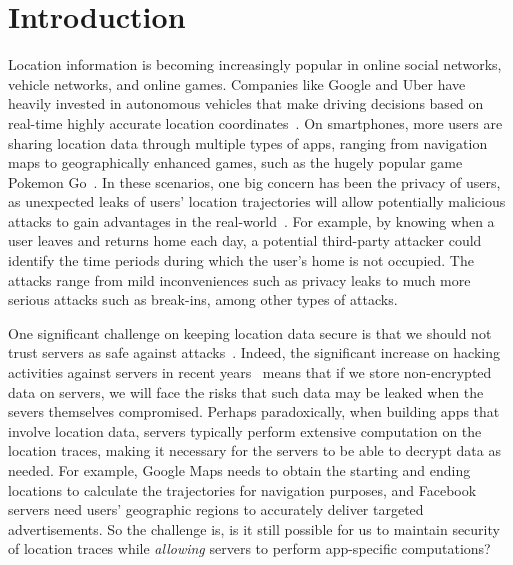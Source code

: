 \section{Introduction}
\label{sec:introduction}

Location information is becoming increasingly popular in online social networks, vehicle networks, and online games. Companies like Google and Uber have heavily invested in autonomous vehicles that make driving decisions based on real-time highly accurate location coordinates~\cite{markoff2010google}. On smartphones, more users are sharing location data through multiple types of apps, ranging from navigation maps to geographically enhanced games, such as the hugely popular game Pokemon Go~\cite{pokeman}. In these scenarios, one big concern has been the privacy of users, as unexpected leaks of users' location trajectories will allow potentially malicious attacks to gain advantages in the real-world~\cite{locationprivacy}. For example, by knowing when a user leaves and returns home each day, a potential third-party attacker could identify the time periods during which the user’s home is not occupied.  The attacks range from mild inconveniences such as privacy leaks to much more serious attacks such as break-ins, among other types of attacks.

One significant challenge on keeping location data secure is that we should not trust servers as safe against attacks~\cite{krutz2010cloud}. Indeed, the significant increase on hacking activities against servers in recent years~\cite{liao2013intrusion,grispos2013calm} means that if we store non-encrypted data on servers, we will face the risks that such data may be leaked when the severs themselves compromised. Perhaps paradoxically, when building apps that involve location data, servers typically perform extensive computation on the location traces, making it necessary for the servers to be able to decrypt data as needed. For example, Google Maps needs to obtain the starting and ending locations to calculate the trajectories for navigation purposes, and Facebook servers need users' geographic regions to accurately deliver targeted advertisements. So the challenge is, is it still possible for us to maintain security of location traces while \emph{allowing} servers to perform app-specific computations?

